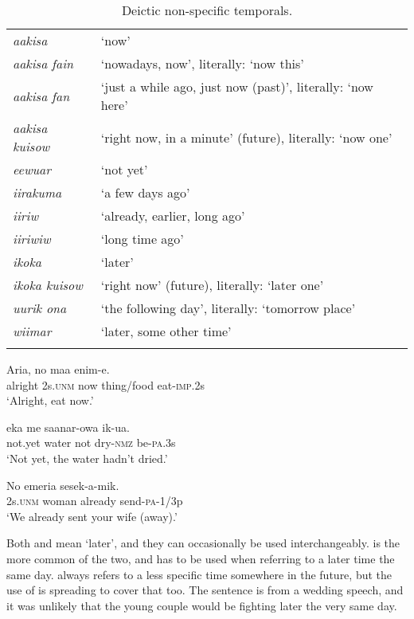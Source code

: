 \begin{table}
\begin{tabular}{>{\itshape}ll}
\mytoprule
aakisa &`now'\\
aakisa fain &`nowadays, now', literally: `now this'\\
aakisa fan &`just a while ago, just now (past)', literally: `now here'\\
aakisa kuisow &`right now, in a minute' (future), literally: `now one'\\
eewuar &`not yet'\\
iirakuma &`a few days ago'\\
iiriw &`already, earlier, long ago'\\
iiriwiw &`long time ago'\\
ikoka &`later'\\
ikoka kuisow &`right now' (future), literally: `later one'\\
uurik ona &`the following day', literally: `tomorrow place'\\
wiimar &`later, some other time'\\
\mybottomrule 
\end{tabular}
\caption{Deictic non-specific temporals.}
\label{tab:3:deicticnonspecifictemporals}
\end{table}

\ea%
\label{ex:3:x473}
\gll Aria, no  maa enim-e. \\
alright 2s.\textsc{unm} now thing/food eat-\textsc{imp}.2s\\
\glt`Alright, eat now.'
\z

\ea%
\label{ex:3:x1215}
\gll {}  eka me saanar-owa ik-ua. \\
not.yet water not dry-\textsc{nmz} be-\textsc{pa}.3s\\
\glt`Not yet, the water hadn't dried.'
\z

\ea%
\label{ex:3:x474}
\gll No emeria  sesek-a-mik. \\
2s.\textsc{unm} woman already send-\textsc{pa}-1/3p\\
\glt`We already sent your wife (away).'
\z

Both  and  mean `later', and they can occasionally be used interchangeably.  is the more common of the two, and has to be used when referring to a later time the same day.  always refers to a less specific time somewhere in the future, but the use of  is spreading to cover that too. The sentence  is from a wedding speech, and it was unlikely that the young couple would be fighting later the very same day.

